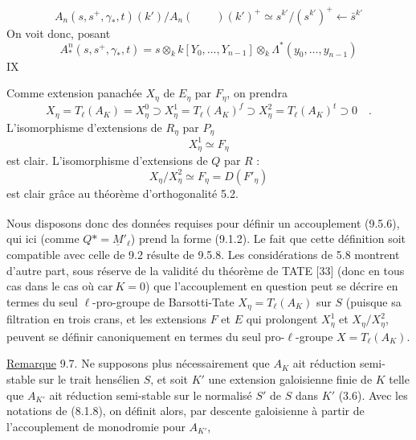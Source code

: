 \[
 A_n(s,s^+,\gamma_*,t)(k')/A_n(\qquad)(k')^+
 \simeq s^{k'}/(s^{k'})^+\longleftarrow\bar s^{k'}
\]
On voit donc, posant
\[
 A_{*}^n(s,s^+,\gamma_*,t)=s\otimes_k k[Y_0,\ldots,Y_{n-1}]\otimes_k\Lambda^*(y_0,\ldots,y_{n-1})
\]
\hfill IX

Comme extension panachée $X_\eta$ de $E_\eta$ par $F_\eta$, on prendra
\[
X_\eta=T_\ell(A_K)=X_\eta^0\supset X_\eta^1=T_\ell(A_K)^f\supset X_\eta^2=T_\ell(A_K)^t\supset 0\quad . \tag*{(9.6.2)}
\]
L'isomorphisme d'extensions de $R_\eta$ par $P_\eta$
\[
X_\eta^1\simeq F_\eta
\]
est clair. L'isomorphisme d'extensions de $Q$ par $R$ :
\[
X_\eta/X_\eta^2\simeq F_\eta=D(F'_\eta)
\]
est clair grâce au théorème d'orthogonalité 5.2.

Nous disposons donc des données requises pour définir un accouplement (9.5.6)\textsuperscript{}, qui ici (comme $Q*= \underline{M}'_\ell$) prend la forme (9.1.2). Le fait que cette définition soit compatible avec celle de 9.2 résulte de 9.5.8. Les considérations de 5.8 montrent d'autre part, sous réserve de la validité du théorème de TATE [33] (donc en tous cas dans le cas où $\mathrm{car}\ K=0$) que l'accouplement en question peut se décrire en termes du seul $\ell$-pro-groupe de Barsotti-Tate $X_\eta=T_\ell(A_K)$ sur $S$ (puisque sa filtration en trois crans, et les extensions $F$ et $E$ qui prolongent $X_\eta^1$ et $X_\eta/X_\eta^2$, peuvent se définir canoniquement en termes du seul pro-$\ell$-groupe $X=T_\ell(A_K)$.

\uline{Remarque} 9.7. Ne supposons plus nécessairement que $A_K$ ait réduction semi-stable sur le trait hensélien $S$, et soit $K'$ une extension galoisienne finie de $K$ telle que $A_{K'}$ ait réduction semi-stable sur le normalisé $S'$ de $S$ dans $K'$ (3.6). Avec les notations de (8.1.8), on définit alors, par descente galoisienne à partir de l'accouplement de monodromie pour $A_{K'}$,

